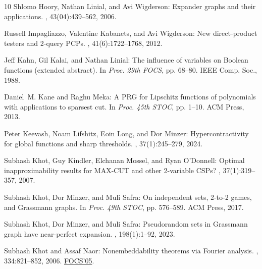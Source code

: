 \documentclass[11pt]{article}
\begin{document}
\begin{thebibliography}{10}
{\sc Shlomo Hoory, Nathan Linial, and Avi Wigderson}: Expander graphs and their
  applications.
, 43(04):439--562, 2006.
\newblock [\epfmtdoi{10.1090/s0273-0979-06-01126-8}]

{\sc Russell Impagliazzo, Valentine Kabanets, and Avi Wigderson}: New
  direct-product testers and 2-query {PCP}s.
, 41(6):1722--1768, 2012.
\newblock [\epfmtdoi{10.1137/09077299X}]

{\sc Jeff Kahn, Gil Kalai, and Nathan Linial}: The influence of variables on
  {Boolean} functions (extended abstract).
\newblock In {\em Proc. 29th FOCS}, pp. 68--80. IEEE Comp. Soc., 1988.

{\sc Daniel~M. Kane and Raghu Meka}: A {PRG} for {L}ipschitz functions of
  polynomials with applications to sparsest cut.
\newblock In {\em Proc. 45th STOC}, pp. 1--10. ACM Press, 2013.
\newblock [\epfmtdoi{10.1145/2488608.2488610}]

{\sc Peter Keevash, Noam Lifshitz, Eoin Long, and Dor Minzer}:
  Hypercontractivity for global functions and sharp thresholds.
, 37(1):245--279, 2024.

{\sc Subhash Khot, Guy Kindler, Elchanan Mossel, and Ryan O'Donnell}: Optimal
  inapproximability results for {MAX-CUT} and other 2-variable {CSP}s?
, 37(1):319--357, 2007.
\newblock [\epfmtdoi{10.1137/S0097539705447372}]

{\sc Subhash Khot, Dor Minzer, and Muli Safra}: On independent sets, 2-to-2
  games, and {G}rassmann graphs.
\newblock In {\em Proc. 49th STOC}, pp. 576--589. ACM Press, 2017.
\newblock [\epfmtdoi{10.1145/3055399.3055432}]

{\sc Subhash Khot, Dor Minzer, and Muli Safra}: Pseudorandom sets in
  {G}rassmann graph have near-perfect expansion.
, 198(1):1--92, 2023.

{\sc Subhash Khot and Assaf Naor}: Nonembeddability theorems via {F}ourier
  analysis.
, 334:821--852, 2006.
\newblock \prelim \href{https://doi.org/10.1109/SFCS.2005.54}{FOCS'05}.
\newblock [\epfmtdoi{10.1007/s00208-005-0745-0}]


\end{thebibliography}
\end{document}

